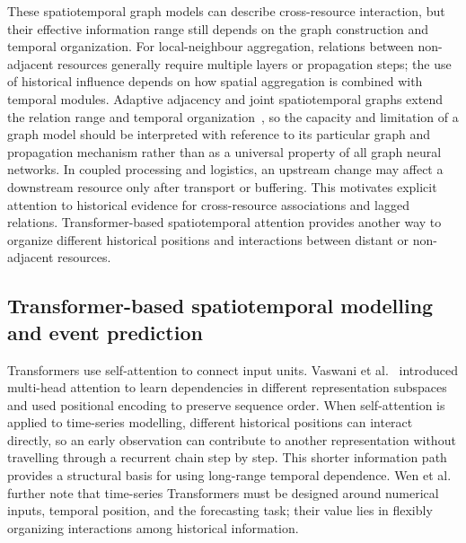 \documentclass[a4paper,fleqn]{cas-dc}
\begin{document}
These spatiotemporal graph models can describe cross-resource interaction, but their effective information range still depends on the graph construction and temporal organization. For local-neighbour aggregation, relations between non-adjacent resources generally require multiple layers or propagation steps; the use of historical influence depends on how spatial aggregation is combined with temporal modules. Adaptive adjacency and joint spatiotemporal graphs extend the relation range and temporal organization~\cite{wu2019graphwavenet,song2020stsgcn}, so the capacity and limitation of a graph model should be interpreted with reference to its particular graph and propagation mechanism rather than as a universal property of all graph neural networks. In coupled processing and logistics, an upstream change may affect a downstream resource only after transport or buffering. This motivates explicit attention to historical evidence for cross-resource associations and lagged relations. Transformer-based spatiotemporal attention provides another way to organize different historical positions and interactions between distant or non-adjacent resources.


\subsection{Transformer-based spatiotemporal modelling and event prediction}

Transformers use self-attention to connect input units. Vaswani et al.~\cite{vaswani2017attention} introduced multi-head attention to learn dependencies in different representation subspaces and used positional encoding to preserve sequence order. When self-attention is applied to time-series modelling, different historical positions can interact directly, so an early observation can contribute to another representation without travelling through a recurrent chain step by step. This shorter information path provides a structural basis for using long-range temporal dependence. Wen et al.~\cite{wen2023transformers} further note that time-series Transformers must be designed around numerical inputs, temporal position, and the forecasting task; their value lies in flexibly organizing interactions among historical information.
\end{document}
